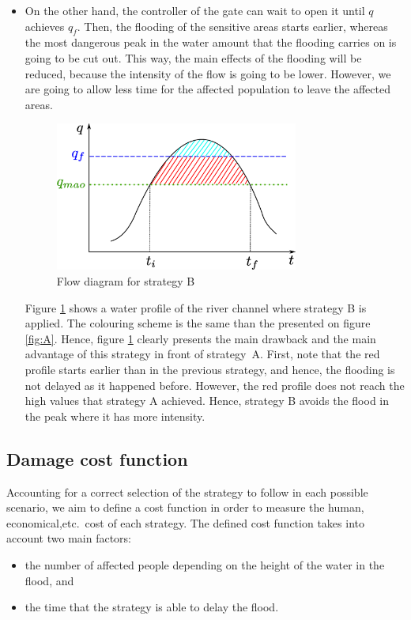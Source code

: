 \begin{itemize}
\item On the other hand, the controller of the gate can wait to open it until $q$ achieves $q_f$. Then, the flooding of the sensitive areas starts earlier, whereas the most dangerous peak in the water amount that the flooding carries on is going to be cut out. This way, the main effects of the flooding will be reduced, because the intensity of the flow is going to be lower. However, we are going to allow less time for the affected population to leave the affected areas.
\begin{figure}\centering
\includegraphics[width=8cm]{basicB}
\caption{Flow diagram for strategy B}
\label{fig:B}
\end{figure}
Figure \ref{fig:B} shows a water profile of the river channel where strategy B is applied. The colouring scheme is the same than the presented on figure \ref{fig:A}. Hence, figure \ref{fig:B} clearly presents the main drawback and the main advantage of this strategy in front of strategy~A. First, note that the red profile starts earlier than in the previous strategy, and hence, the flooding is not delayed as it happened before. However, the red profile does not reach the high values that strategy A achieved. Hence, strategy B avoids the flood in the peak where it has more intensity.
\end{itemize}

\subsection{Damage cost function}
Accounting for a correct selection of the strategy to follow in each possible scenario, we aim to define a cost 
 function in order to measure the human, economical,etc.\ cost of each strategy. The defined cost function takes into account two main factors:
 \begin{itemize}
 \item the number of affected people depending on the height  of the water in the flood, and 
 \item the time that the strategy is able to delay the flood.
 \end{itemize}


